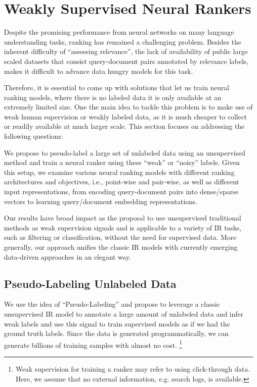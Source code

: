 \section{Weakly Supervised Neural Rankers}
\label{sec:weakly_supervised_neural_rankers}
Despite the promising performance from neural networks on many language understanding tasks, ranking has remained a challenging problem. Besides the inherent difficulty of ``assessing relevance'', the lack of availability of public large scaled datasets that consist query-document pairs annotated by relevance labels, makes it difficult to advance data hungry models for this task.

Therefore, it is essential to come up with solutions that let us train neural ranking models, where there is no labeled data it is only available at an extremely limited size. 
One the main idea to tackle this problem is to make use of weak human supervision or weakly labeled data, as it is much cheaper to collect or readily available at much larger scale. This section focuses on addressing the following questions:

We propose to pseudo-label a large set of unlabeled data using an unsupervised method and train a neural ranker using these ``weak'' or ``noisy'' labels. Given this setup, we examine various neural ranking models with different ranking architectures and objectives, i.e., point-wise and pair-wise, as well as different input representations, from encoding query-document pairs into dense\:/\:sparse vectors to learning query\:/\:document embedding representations. 

Our results have broad impact as the proposal to use unsupervised traditional methods as weak supervision signals and is applicable to a variety of IR tasks, such as filtering or classification, without the need for supervised data.  More generally, our approach unifies the classic IR models with currently emerging data-driven approaches in an elegant way.

\subsection{Pseudo-Labeling Unlabeled Data}
\label{sec:pseudo_labeling}
We use the idea of ``Pseudo-Labeling'' and propose to leverage a classic unsupervised IR model to annotate a large amount of unlabeled data and infer weak labels and use this signal to train supervised models as if we had the ground truth labels.
Since the data is generated programmatically, we can generate billions of training samples with almost no cost. 
\footnote{Weak supervision for training a ranker may refer to using click-through data. Here, we assume that no external information, e.g. search logs, is available.}

